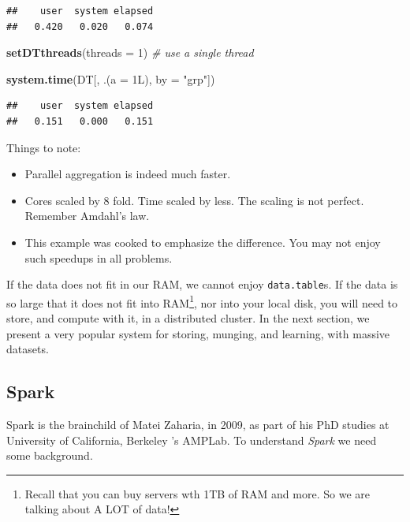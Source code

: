 \documentclass[]{book}
\newenvironment{Shaded}{\begin{snugshade}}{\end{snugshade}}
\newcommand{\CommentTok}[1]{\textcolor[rgb]{0.56,0.35,0.01}{\textit{#1}}}
\newcommand{\DataTypeTok}[1]{\textcolor[rgb]{0.13,0.29,0.53}{#1}}
\newcommand{\DecValTok}[1]{\textcolor[rgb]{0.00,0.00,0.81}{#1}}
\newcommand{\KeywordTok}[1]{\textcolor[rgb]{0.13,0.29,0.53}{\textbf{#1}}}
\newcommand{\NormalTok}[1]{#1}
\newcommand{\StringTok}[1]{\textcolor[rgb]{0.31,0.60,0.02}{#1}}
\providecommand{\tightlist}{%
  \setlength{\itemsep}{0pt}\setlength{\parskip}{0pt}}
\theoremstyle{definition}
\theoremstyle{definition}
\theoremstyle{definition}
\theoremstyle{remark}
\begin{document}
\begin{verbatim}
##    user  system elapsed 
##   0.420   0.020   0.074
\end{verbatim}

\begin{Shaded}
\begin{Highlighting}[]
\KeywordTok{setDTthreads}\NormalTok{(}\DataTypeTok{threads =} \DecValTok{1}\NormalTok{) }\CommentTok{# use a single thread}

\KeywordTok{system.time}\NormalTok{(DT[, .(}\DataTypeTok{a =}\NormalTok{ 1L), }\DataTypeTok{by =} \StringTok{"grp"}\NormalTok{])}
\end{Highlighting}
\end{Shaded}

\begin{verbatim}
##    user  system elapsed 
##   0.151   0.000   0.151
\end{verbatim}

Things to note:

\begin{itemize}
\tightlist
\item
  Parallel aggregation is indeed much faster.
\item
  Cores scaled by 8 fold. Time scaled by less. The scaling is not perfect. Remember Amdahl's law.
\item
  This example was cooked to emphasize the difference. You may not enjoy such speedups in all problems.
\end{itemize}

If the data does not fit in our RAM, we cannot enjoy \texttt{data.table}s.
If the data is so large that it does not fit into RAM\footnote{Recall that you can buy servers wth 1TB of RAM and more. So we are talking about A LOT of data!}, nor into your local disk, you will need to store, and compute with it, in a distributed cluster.
In the next section, we present a very popular system for storing, munging, and learning, with massive datasets.

\hypertarget{spark}{%
\subsection{Spark}\label{spark}}

Spark is the brainchild of Matei Zaharia, in 2009, as part of his PhD studies at University of California, Berkeley 's AMPLab.
To understand \emph{Spark} we need some background.
\end{document}
